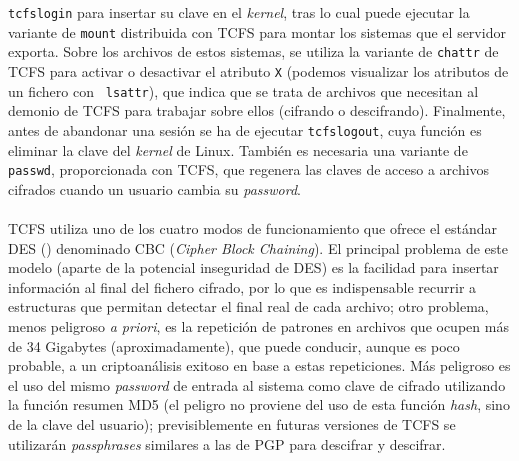 {\tt tcfslogin} para insertar su clave en el {\it kernel}, tras lo cual puede
ejecutar la variante de {\tt mount} distribuida con TCFS para montar los 
sistemas que el servidor exporta. Sobre los archivos de estos sistemas, se
utiliza la variante de {\tt chattr} de TCFS para activar o desactivar el 
atributo {\tt X} (podemos visualizar los atributos de un fichero con {\tt 
lsattr}), que indica que se trata de archivos que necesitan al demonio de TCFS
para trabajar sobre ellos (cifrando o descifrando). Finalmente, antes de
abandonar una sesi\'on se ha de ejecutar {\tt tcfslogout}, cuya funci\'on es
eliminar la clave del {\it kernel} de Linux. Tambi\'en es necesaria una
variante de {\tt passwd}, proporcionada con TCFS, que regenera las claves
de acceso a archivos cifrados cuando un usuario cambia su {\it password}.\\
\\TCFS utiliza uno de los cuatro modos de funcionamiento que ofrece el 
est\'andar DES (\cite{kn:fips81}) denominado CBC ({\it Cipher Block Chaining}).
El principal problema de este modelo (aparte de la potencial inseguridad de
DES) es la facilidad para insertar informaci\'on al final del fichero cifrado,
por lo que es indispensable recurrir a estructuras que permitan detectar el
final real de cada archivo; otro problema, menos peligroso {\it a priori}, es
la repetici\'on de patrones en archivos que ocupen m\'as de 34 Gigabytes
(aproximadamente), que puede conducir, aunque es poco probable, a un 
criptoan\'alisis exitoso en base a estas repeticiones. M\'as peligroso es el
uso del mismo {\it password} de entrada al sistema como clave de cifrado 
utilizando la funci\'on resumen MD5 (el peligro no proviene del uso de esta
funci\'on {\it hash}, sino de la clave del usuario); previsiblemente en futuras
versiones de TCFS se utilizar\'an {\it passphrases} similares a las de PGP para
descifrar y descifrar.
